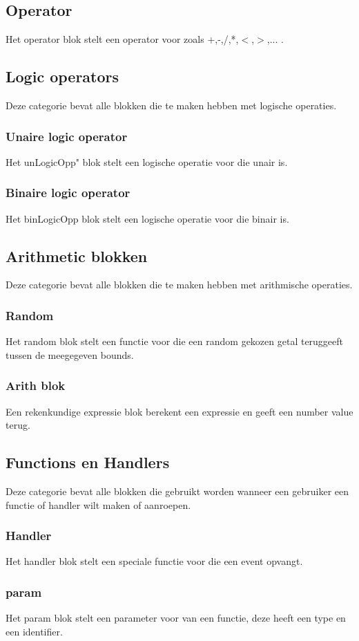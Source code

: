 \documentclass[]{article}
\begin{document}
\subsection{Operator}
Het operator blok stelt een operator voor zoals +,-,/,*,$<$,$>$,... . 

\subsection{Logic operators}
Deze categorie bevat alle blokken die te maken hebben met logische operaties.
\subsubsection{Unaire logic operator}
Het unLogicOpp" blok stelt een logische operatie voor die unair is. 
\subsubsection{Binaire logic operator}
Het binLogicOpp blok stelt een logische operatie voor die binair is. 

\subsection{Arithmetic blokken}
Deze categorie bevat alle blokken die te maken hebben met arithmische operaties.
\subsubsection{Random}
Het random blok stelt een functie voor die een random gekozen getal teruggeeft tussen de meegegeven bounds. 
\subsubsection{Arith blok}
Een rekenkundige expressie blok berekent een expressie en geeft een number value terug.

\subsection{Functions en Handlers}
Deze categorie bevat alle blokken die gebruikt worden wanneer een gebruiker een functie of handler wilt maken of aanroepen.
\subsubsection{Handler}
Het handler blok stelt een speciale functie voor die een event opvangt. 
\subsubsection{param}
Het param blok stelt een parameter voor van een functie, deze heeft een type en een identifier.
\end{document}
